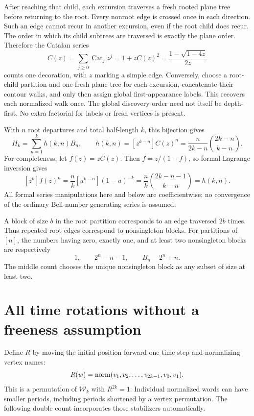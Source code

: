 \documentclass[11pt,letterpaper]{article}
\theoremstyle{remark}\newtheorem{remark}[theorem]{Remark}
\newcommand{\Wc}{\mathcal W}\newcommand{\Uc}{\mathcal U}\newcommand{\Part}{\operatorname{Part}}
\newcommand{\Cat}{\operatorname{Cat}}\newcommand{\E}{\mathbb E}\newcommand{\Prob}{\mathbb P}\newcommand{\ind}{\mathbf 1}
\theoremstyle{definition}\newtheorem{definition}[theorem]{Definition}
\begin{document}
After reaching that child, each excursion traverses a fresh rooted plane tree before returning to the root. Every nonroot edge is crossed once in each direction. Such an edge cannot recur in another excursion, even if the root child does recur. The order in which its child subtrees are traversed is exactly the plane order. Therefore the Catalan series
\[
 C(z)=\sum_{j\ge0}\Cat_jz^j=1+zC(z)^2
       =\frac{1-\sqrt{1-4z}}{2z}
\]
counts one decoration, with $z$ marking a simple edge. Conversely, choose a root-child partition and one fresh plane tree for each excursion, concatenate their contour walks, and only then assign global first-appearance labels. This recovers each normalized walk once. The global discovery order need not itself be depth-first. No extra factorial for labels or fresh vertices is present.

With $n$ root departures and total half-length $k$, this bijection gives
\begin{equation}\label{sgm:lw:eq:H}
 H_k=\sum_{n=1}^k h(k,n)B_n,\qquad
 h(k,n)=[z^{k-n}]C(z)^n
       =\frac{n}{2k-n}\binom{2k-n}{k-n}.
\end{equation}
For completeness, let $f(z)=zC(z)$. Then $f=z/(1-f)$, so formal Lagrange inversion gives
\[
 [z^k]f(z)^n=\frac nk[u^{k-n}](1-u)^{-k}
 =\frac nk\binom{2k-n-1}{k-n}
 =h(k,n).
\]
All formal series manipulations here and below are coefficientwise; no convergence of the ordinary Bell-number generating series is assumed.

A block of size $b$ in the root partition corresponds to an edge traversed $2b$ times. Thus repeated root edges correspond to nonsingleton blocks. For partitions of $[n]$, the numbers having zero, exactly one, and at least two nonsingleton blocks are respectively
\begin{equation}\label{sgm:lw:eq:nonsingleton}
 1,\qquad 2^n-n-1,\qquad B_n-2^n+n.
\end{equation}
The middle count chooses the unique nonsingleton block as any subset of size at least two.

\section{All time rotations without a freeness assumption}
Define $R$ by moving the initial position forward one time step and normalizing vertex names:
\[
 R(w)=\operatorname{norm}(v_1,v_2,\ldots,v_{2k-1},v_0,v_1).
\]
This is a permutation of $\Wc_k$ with $R^{2k}=1$. Individual normalized words can have smaller periods, including periods shortened by a vertex permutation. The following double count incorporates those stabilizers automatically.
\end{document}
